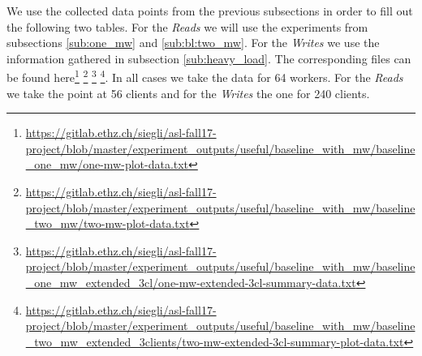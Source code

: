 \documentclass[11pt,a4paper]{article}
\let\ti\textit
\begin{document}
We use the collected data points from the previous subsections in order to fill out the following two tables. For the \ti{Reads} we will use the experiments from subsections \ref{sub:one_mw} and \ref{sub:bl:two_mw}. For the \ti{Writes} we use the information gathered in subsection \ref{sub:heavy_load}. The corresponding files can be found here\footnote{\url{https://gitlab.ethz.ch/siegli/asl-fall17-project/blob/master/experiment_outputs/useful/baseline_with_mw/baseline_one_mw/one-mw-plot-data.txt} } \footnote{\url{https://gitlab.ethz.ch/siegli/asl-fall17-project/blob/master/experiment_outputs/useful/baseline_with_mw/baseline_two_mw/two-mw-plot-data.txt} } \footnote{\url{https://gitlab.ethz.ch/siegli/asl-fall17-project/blob/master/experiment_outputs/useful/baseline_with_mw/baseline_one_mw_extended_3cl/one-mw-extended-3cl-summary-data.txt} } \footnote{\url{https://gitlab.ethz.ch/siegli/asl-fall17-project/blob/master/experiment_outputs/useful/baseline_with_mw/baseline_two_mw_extended_3clients/two-mw-extended-3cl-summary-plot-data.txt}}. In all cases we take the data for 64 workers. For the \ti{Reads} we take the point at 56 clients and for the \ti{Writes} the one for 240 clients.
\end{document}
